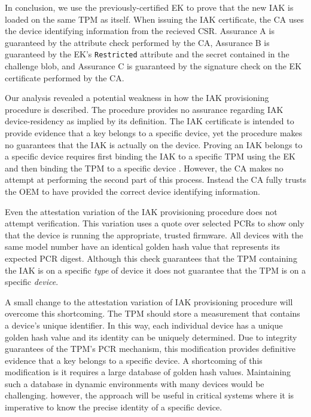 \documentclass[runningheads]{llncs}
\begin{document}
In conclusion, we use the previously-certified EK to prove that the new
IAK is loaded on the same TPM as itself. When issuing the IAK
certificate, the CA uses the device identifying information from the
recieved CSR.  Assurance A is guaranteed by the attribute check
performed by the CA, Assurance B is guaranteed by the EK's
\verb|Restricted| attribute and the secret contained in the challenge
blob, and Assurance C is guaranteed by the signature check on the EK
certificate performed by the CA.

Our analysis revealed a potential weakness in how the IAK provisioning
procedure is described. The procedure provides no assurance regarding
IAK device-residency as implied by its definition.  The IAK
certificate is intended to provide evidence that a key belongs to a
specific device, yet the procedure makes no guarantees that the IAK is
actually on the device.  Proving an IAK belongs to a specific device
requires first binding the IAK to a specific TPM using the EK and then
binding the TPM to a specific device \citep{DevIDSpec-TCG}.  However,
the CA makes no attempt at performing the second part of this
process. Instead the CA fully trusts the OEM to have provided the
correct device identifying information.

Even the attestation variation of the IAK provisioning procedure does
not attempt verification. This variation uses a quote over selected
PCRs to show only that the device is running the appropriate, trusted
firmware. All devices with the same model number have an identical
golden hash value that represents its expected PCR digest.  Although
this check guarantees that the TPM containing the IAK is on a specific
\textit{type} of device it does not guarantee that the TPM is on a
specific \emph{device}.

A small change to the attestation variation of IAK provisioning
procedure will overcome this shortcoming. The TPM should store a
measurement that contains a device's unique identifier. In this way,
each individual device has a unique golden hash value and its identity
can be uniquely determined.  Due to integrity guarantees of the TPM's
PCR mechanism, this modification provides definitive evidence that a
key belongs to a specific device. A shortcoming of this modification
is it requires a large database of golden hash values. Maintaining
such a database in dynamic environments with many devices would be
challenging.  however, the approach will be useful in critical systems
where it is imperative to know the precise identity of a specific
device.
%
%
%
\end{document}
